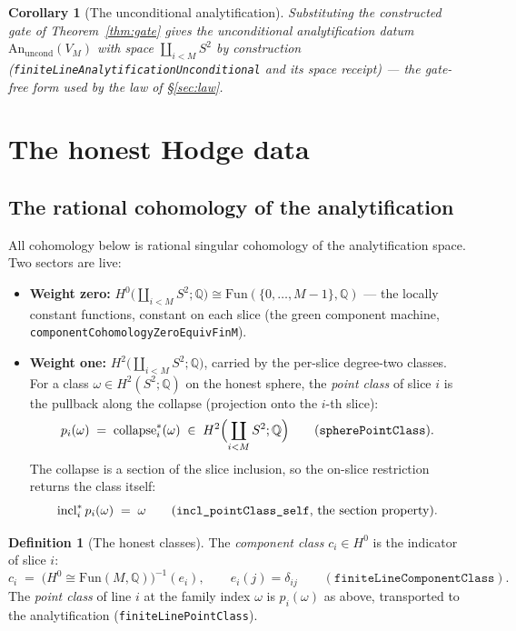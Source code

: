 \documentclass[11pt,a4paper]{article}
\theoremstyle{plain}
\newtheorem{corollary}[theorem]{Corollary}
\theoremstyle{definition}
\newtheorem{definition}[theorem]{Definition}
\newcommand{\Q}{\mathbb{Q}}
\begin{document}
\begin{corollary}[The unconditional analytification]
\label{cor:uncond-an}
Substituting the constructed gate of Theorem~\ref{thm:gate} gives the
unconditional analytification datum
$\mathrm{An}_{\mathrm{uncond}}(V_M)$ with space
$\coprod_{i<M} S^2$ \emph{by construction}
(\texttt{finiteLineAnalytificationUnconditional} and its space
receipt) --- the gate-free form used by the law of \S\ref{sec:law}.
\end{corollary}

\section{The honest Hodge data}\label{sec:hodge}

\subsection{The rational cohomology of the analytification}

All cohomology below is rational singular cohomology of the
analytification space.  Two sectors are live:

\begin{itemize}
\item \textbf{Weight zero:} $H^0\bigl(\coprod_{i<M} S^2;\Q\bigr)
\cong \mathrm{Fun}(\{0,\dots,M-1\}, \Q)$ --- the locally constant
functions, constant on each slice (the green component machine,
\texttt{componentCohomologyZeroEquivFinM}).
\item \textbf{Weight one:} $H^2\bigl(\coprod_{i<M} S^2;\Q\bigr)$,
carried by the per-slice degree-two classes.  For a class $\omega \in
H^2(S^2;\Q)$ on the honest sphere, the \emph{point class} of slice
$i$ is the pullback along the collapse (projection onto the $i$-th
slice):
\[
p_i(\omega) \;=\; \mathrm{collapse}_i^*(\omega) \;\in\;
H^2\Bigl(\coprod_{i<M} S^2;\Q\Bigr)
\qquad
\text{(\texttt{spherePointClass})}.
\]
The collapse is a section of the slice inclusion, so the on-slice
restriction returns the class itself:
\begin{equation}\label{eq:section}
\mathrm{incl}_i^*\, p_i(\omega) \;=\; \omega
\qquad
\text{(\texttt{incl\_pointClass\_self}, the section property).}
\end{equation}
\end{itemize}

\begin{definition}[The honest classes]\label{def:classes}
The \emph{component class} $c_i \in H^0$ is the indicator of slice
$i$:
\[
c_i \;=\; \bigl(H^0 \cong \mathrm{Fun}(M,\Q)\bigr)^{-1}(e_i),
\qquad e_i(j) = \delta_{ij}
\qquad (\texttt{finiteLineComponentClass}).
\]
The \emph{point class} of line $i$ at the family index $\omega$ is
$p_i(\omega)$ as above, transported to the analytification
(\texttt{finiteLinePointClass}).
\end{definition}
\end{document}
